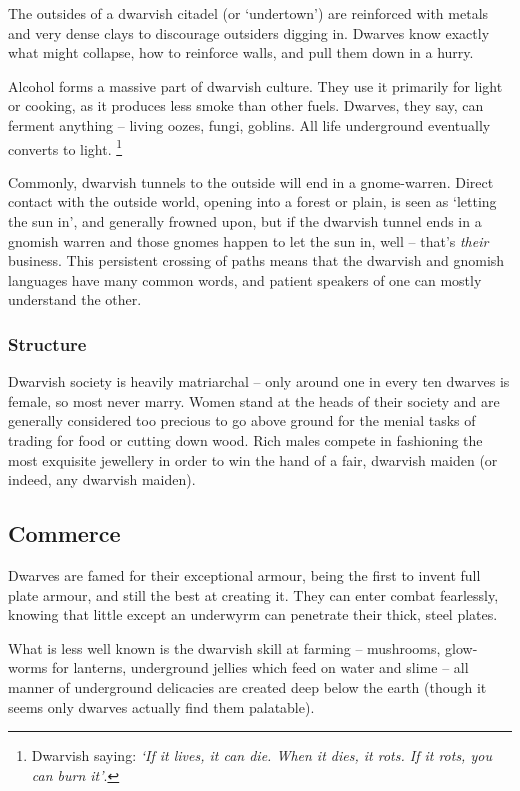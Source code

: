 \begin{multicols}{2}
The outsides of a dwarvish citadel (or `undertown') are reinforced with metals and very dense clays to discourage outsiders digging in.
Dwarves know exactly what might collapse, how to reinforce walls, and pull them down in a hurry.

Alcohol forms a massive part of dwarvish culture.
They use it primarily for light or cooking, as it produces less smoke than other fuels.
Dwarves, they say, can ferment anything -- living oozes, fungi, goblins.
All life underground eventually converts to light.%
\footnote{Dwarvish saying: \textit{`If it lives, it can die. When it dies, it rots. If it rots, you can burn it'}.}

Commonly, dwarvish tunnels to the outside will end in a gnome-warren.
Direct contact with the outside world, opening into a forest or plain, is seen as `letting the sun in',
and generally frowned upon, but if the dwarvish tunnel ends in a gnomish warren and those gnomes happen to let the sun in, well -- that's \emph{their} business.
This persistent crossing of paths means that the dwarvish and gnomish languages have many common words, and patient speakers of one can mostly understand the other.

\subsubsection{Structure}
Dwarvish society is heavily matriarchal -- only around one in every ten dwarves is female, so most never marry.
Women stand at the heads of their society and are generally considered too precious to go above ground for the menial tasks of trading for food or cutting down wood.
Rich males compete in fashioning the most exquisite jewellery in order to win the hand of a fair, dwarvish maiden (or indeed, any dwarvish maiden).

\subsection{Commerce}

Dwarves are famed for their exceptional armour, being the first to invent full plate armour, and still the best at creating it.
They can enter combat fearlessly, knowing that little except an underwyrm can penetrate their thick, steel plates.

What is less well known is the dwarvish skill at farming -- mushrooms, glow-worms for lanterns, underground jellies which feed on water and slime -- all manner of underground delicacies are created deep below the earth (though it seems only dwarves actually find them palatable).


\end{multicols}

